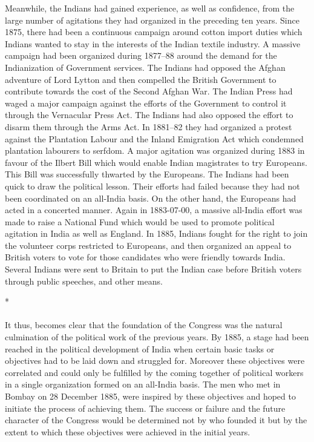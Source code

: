 Meanwhile, the Indians had gained experience, as well as confidence, from the large number of agitations they had organized in the preceding ten years. Since 1875, there had been a continuous campaign around cotton import duties which Indians wanted to stay in the interests of the Indian textile industry. A massive campaign had been organized during 1877--88 around the demand for the Indianization of Government services. The Indians had opposed the Afghan adventure of Lord Lytton and then compelled the British Government to contribute towards the cost of the Second Afghan War. The Indian Press had waged a major campaign against the efforts of the Government to control it through the Vernacular Press Act. The Indians had also opposed the effort to disarm them through the Arms Act. In 1881--82 they had organized a protest against the Plantation Labour and the Inland Emigration Act which condemned plantation labourers to serfdom. A major agitation was organized during 1883 in favour of the Ilbert Bill which would enable Indian magistrates to try Europeans. This Bill was successfully thwarted by the Europeans. The Indians had been quick to draw the political lesson. Their efforts had failed because they had not been coordinated on an all-India basis. On the other hand, the Europeans had acted in a concerted manner. Again in 1883-07-00, a massive all-India effort was made to raise a National Fund which would be used to promote political agitation in India as well as England. In 1885, Indians fought for the right to join the volunteer corps restricted to Europeans, and then organized an appeal to British voters to vote for those candidates who were friendly towards India. Several Indians were sent to Britain to put the Indian case before British voters through public speeches, and other means.

\begin{center}*\end{center}

\paragraph*{}

It thus, becomes clear that the foundation of the Congress was the natural culmination of the political work of the previous years. By 1885, a stage had been reached in the political development of India when certain basic tasks or objectives had to be laid down and struggled for. Moreover these objectives were correlated and could only be fulfilled by the coming together of political workers in a single organization formed on an all-India basis. The men who met in Bombay on 28 December 1885, were inspired by these objectives and hoped to initiate the process of achieving them. The success or failure and the future character of the Congress would be determined not by who founded it but by the extent to which these objectives were achieved in the initial years.

